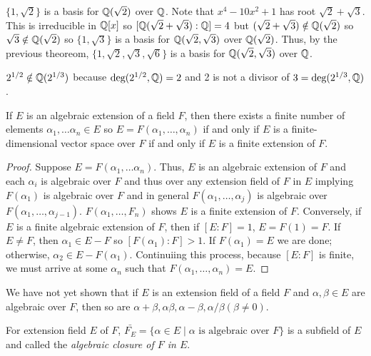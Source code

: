 \begin{example}
    $\{1,\sqrt{2}\}$ is a basis for $\mathbb{Q}(\sqrt{2})$ over $\mathbb{Q}$. Note that $x^4-10x^2+1$ has root $\sqrt{2}+\sqrt{3}$. This is irreducible in $\mathbb{Q}[x]$ so $[\mathbb{Q}(\sqrt{2}+\sqrt{3}):\mathbb{Q}] = 4$ but $(\sqrt{2}+\sqrt{3}) \notin \mathbb{Q}(\sqrt{2})$ so $\sqrt{3} \notin \mathbb{Q}(\sqrt{2})$ so $\{1,\sqrt{3}\}$ is a basis for $\mathbb{Q}(\sqrt{2}, \sqrt{3})$ over $\mathbb{Q}(\sqrt{2})$. Thus, by the previous theoreom, $\{1,\sqrt{2},\sqrt{3},\sqrt{6}\}$ is a basis for $\mathbb{Q}(\sqrt{2},\sqrt{3})$ over $\mathbb{Q}$.
\end{example}
\begin{example}
    $2^{1/2} \notin \mathbb{Q}(2^{1/3})$ because $\text{deg}(2^{1/2},\mathbb{Q}) =2$ and 2 is not a divisor of $3 = \text{deg}(2^{1/3},\mathbb{Q})$.
\end{example}
\begin{theorem}
    If $E$ is an algebraic extension of a field $F$, then there exists a finite number of elements $\alpha_1, \ldots \alpha_n \in E$ so $E = F(\alpha_1, \ldots, \alpha_n)$ if and only if $E$ is a finite-dimensional vector space over $F$ if and only if $E$ is a finite extension of $F$.
\end{theorem}
\begin{proof}
    Suppose $E  =F(\alpha_1, \ldots \alpha_n)$. Thus, $E$ is an algebraic extension of $F$ and each $\alpha_i$ is algebraic over $F$ and thus over any extension field of $F$ in $E$ implying $F(\alpha_1)$ is algebraic over $F$ and in general $F(\alpha_1, \ldots, \alpha_j)$ is algebraic over $F(\alpha_1, \ldots, \alpha_{j-1})$. $F(\alpha_1, \ldots, F_n)$ shows $E$ is a finite extension of $F$. Conversely, if $E$ is a finite algebraic extension of $F$, then if $[E:F] = 1$, $E = F(1) = F$. If $E \neq F$, then $\alpha_1 \in E-F$ so $[F(\alpha_1):F] >1$. If $F(\alpha_1) = E$ we are done; otherwise, $\alpha_2 \in E-F(\alpha_1)$. Continuiing this process, because $[E:F]$ is finite, we must arrive at some $\alpha_n$ such that $F(\alpha_1, \ldots, \alpha_n) = E$.
\end{proof}
\begin{remark}
    We have not yet shown that if $E$ is an extension field of a field $F$ and $\alpha, \beta \in E$ are algebraic over $F$, then so are $\alpha+\beta, \alpha\beta, \alpha - \beta, \alpha/\beta (\beta \neq 0)$.
\end{remark}
\begin{definition}
    For extension field $E$ of $F$, $\bar{F_E}  =\{\alpha \in E \mid \alpha \text{ is algebraic over }F\}$ is a subfield of $E$ and called the \emph{algebraic closure of $F$ in $E$}.
\end{definition}
